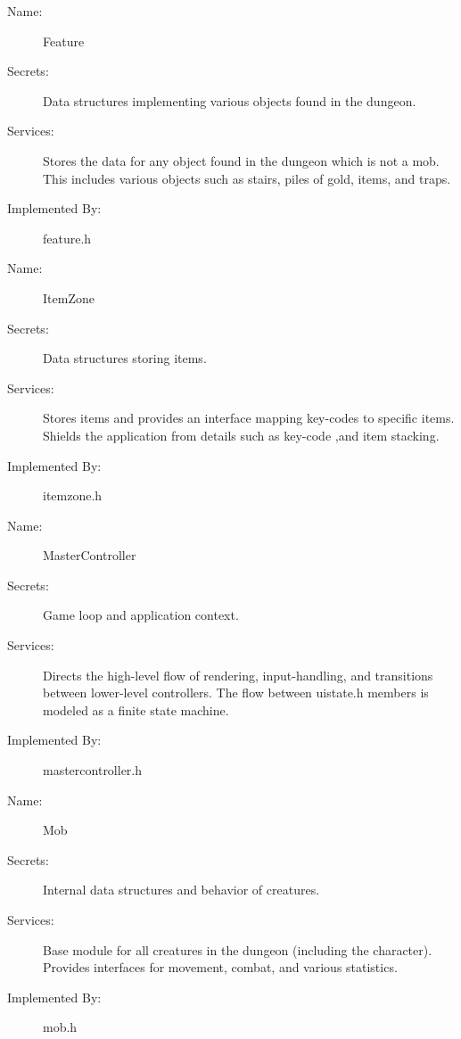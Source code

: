 \documentclass[12pt, titlepage]{article}
\begin{document}
        \bigskip\begin{description}
            \item[Name:]Feature
            \item[Secrets:]Data structures implementing various objects found in the dungeon.
            \item[Services:]Stores the data for any object found in the dungeon which is not a mob. This includes various objects such as stairs, piles of gold, items, and traps.
            \item[Implemented By:]feature.h
        \end{description}

        \bigskip\begin{description}
            \item[Name:]ItemZone
            \item[Secrets:]Data structures storing items.
            \item[Services:]Stores items and provides an interface mapping key-codes to specific items. Shields the application from details such as key-code ,and item stacking. 
            \item[Implemented By:]itemzone.h
        \end{description}

        \bigskip\begin{description}
            \item[Name:]MasterController
            \item[Secrets:]Game loop and application context.
            \item[Services:]Directs the high-level flow of rendering, input-handling, and transitions between lower-level controllers. The flow between uistate.h members is modeled as a finite state machine.
            \item[Implemented By:]mastercontroller.h
        \end{description}

        \bigskip\begin{description}
            \item[Name:]Mob
            \item[Secrets:]Internal data structures and behavior of creatures.
            \item[Services:]Base module for all creatures in the dungeon (including the character). Provides interfaces for movement, combat, and various statistics.
            \item[Implemented By:]mob.h
        \end{description}
\end{document}
